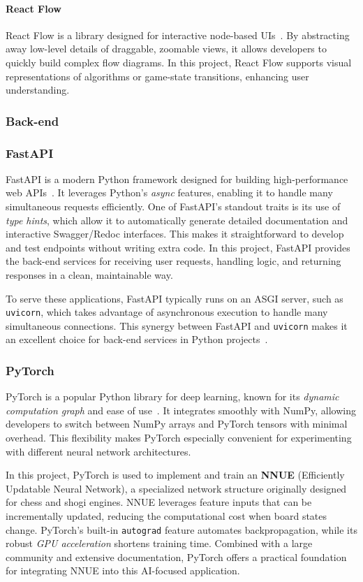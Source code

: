 \documentclass[12pt,a4paper]{article}
\begin{document}
\paragraph{React Flow}
React Flow is a library designed for interactive node-based UIs~\cite{reactflowDocs}. By abstracting away low-level details of draggable, zoomable views, it allows developers to quickly build complex flow diagrams. In this project, React Flow supports visual representations of algorithms or game-state transitions, enhancing user understanding.

\subsubsection{Back-end}
\subsubsection*{FastAPI}
FastAPI is a modern Python framework designed for building high-performance web APIs~\cite{fastapiDocs}. It leverages Python's \emph{async} features, enabling it to handle many simultaneous requests efficiently. One of FastAPI’s standout traits is its use of \emph{type hints}, which allow it to automatically generate detailed documentation and interactive Swagger/Redoc interfaces. This makes it straightforward to develop and test endpoints without writing extra code. In this project, FastAPI provides the back-end services for receiving user requests, handling logic, and returning responses in a clean, maintainable way.

To serve these applications, FastAPI typically runs on an ASGI server, such as \texttt{uvicorn}, which takes advantage of asynchronous execution to handle many simultaneous connections. This synergy between FastAPI and \texttt{uvicorn} makes it an excellent choice for back-end services in Python projects~\cite{uvicornDocs}.

\subsubsection*{PyTorch}
PyTorch is a popular Python library for deep learning, known for its \emph{dynamic computation
graph} and ease of use~\cite{pytorchDocs}. It integrates smoothly with NumPy, allowing developers
to switch between NumPy arrays and PyTorch tensors with minimal overhead. This flexibility makes
PyTorch especially convenient for experimenting with different neural network architectures.

In this project, PyTorch is used to implement and train an \textbf{NNUE} (Efficiently Updatable
Neural Network), a specialized network structure originally designed for chess and shogi engines.
NNUE leverages feature inputs that can be incrementally updated, reducing the computational cost
when board states change. PyTorch’s built-in \texttt{autograd} feature automates backpropagation,
while its robust \emph{GPU acceleration} shortens training time. Combined with a large community
and extensive documentation, PyTorch offers a practical foundation for integrating NNUE into
this AI-focused application.
\end{document}
